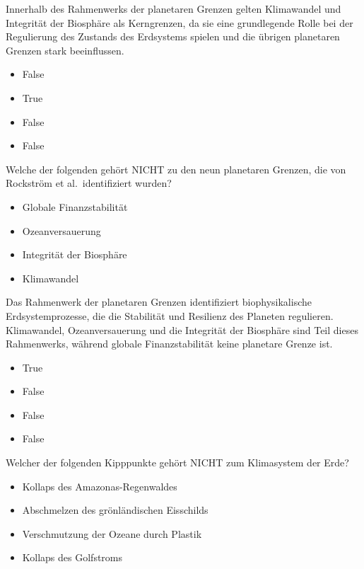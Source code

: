 \documentclass[
  nswissgerman,
  a4paper,
  openany]{book}
\providecommand{\tightlist}{%
  \setlength{\itemsep}{0pt}\setlength{\parskip}{0pt}}
\begin{document}
Innerhalb des Rahmenwerks der planetaren Grenzen gelten Klimawandel und
Integrität der Biosphäre als Kerngrenzen, da sie eine grundlegende Rolle
bei der Regulierung des Zustands des Erdsystems spielen und die übrigen
planetaren Grenzen stark beeinflussen.

\begin{itemize}
\tightlist
\item
  False
\item
  True
\item
  False
\item
  False
\end{itemize}

Welche der folgenden gehört NICHT zu den neun planetaren Grenzen, die
von Rockström et al.~identifiziert wurden?

\begin{itemize}
\tightlist
\item[$\square$]
  Globale Finanzstabilität
\item[$\square$]
  Ozeanversauerung
\item[$\square$]
  Integrität der Biosphäre
\item[$\square$]
  Klimawandel
\end{itemize}

Das Rahmenwerk der planetaren Grenzen identifiziert biophysikalische
Erdsystemprozesse, die die Stabilität und Resilienz des Planeten
regulieren. Klimawandel, Ozeanversauerung und die Integrität der
Biosphäre sind Teil dieses Rahmenwerks, während globale Finanzstabilität
keine planetare Grenze ist.

\begin{itemize}
\tightlist
\item
  True
\item
  False
\item
  False
\item
  False
\end{itemize}

Welcher der folgenden Kipppunkte gehört NICHT zum Klimasystem der Erde?

\begin{itemize}
\tightlist
\item[$\square$]
  Kollaps des Amazonas-Regenwaldes
\item[$\square$]
  Abschmelzen des grönländischen Eisschilds
\item[$\square$]
  Verschmutzung der Ozeane durch Plastik
\item[$\square$]
  Kollaps des Golfstroms
\end{itemize}
\end{document}

